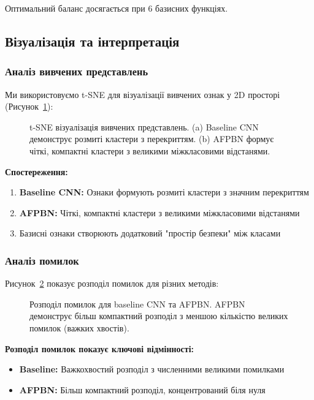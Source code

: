 \documentclass[12pt,a4paper]{article}
\begin{document}
Оптимальний баланс досягається при 6 базисних функціях.

\subsection{Візуалізація та інтерпретація}

\subsubsection{Аналіз вивчених представлень}

Ми використовуємо t-SNE для візуалізації вивчених ознак у 2D просторі (Рисунок~\ref{fig:feature_visualization}):

\begin{figure}[htbp]
	\centering
	\caption{t-SNE візуалізація вивчених представлень. (a) Baseline CNN демонструє розмиті кластери з перекриттям. (b) AFPBN формує чіткі, компактні кластери з великими міжкласовими відстанями.}
	\label{fig:feature_visualization}
\end{figure}

\textbf{Спостереження:}
\begin{enumerate}
	\item \textbf{Baseline CNN:} Ознаки формують розмиті кластери з значним перекриттям
	\item \textbf{AFPBN:} Чіткі, компактні кластери з великими міжкласовими відстанями
	\item Базисні ознаки створюють додатковий "простір безпеки" між класами
\end{enumerate}

\subsubsection{Аналіз помилок}

Рисунок~\ref{fig:error_analysis} показує розподіл помилок для різних методів:

\begin{figure}[htbp]
	\centering
	\caption{Розподіл помилок для baseline CNN та AFPBN. AFPBN демонструє більш компактний розподіл з меншою кількістю великих помилок (важких хвостів).}
	\label{fig:error_analysis}
\end{figure}

\textbf{Розподіл помилок показує ключові відмінності:}
\begin{itemize}
	\item \textbf{Baseline:} Важкохвостий розподіл з численними великими помилками
	\item \textbf{AFPBN:} Більш компактний розподіл, концентрований біля нуля
\end{itemize}
\end{document}
